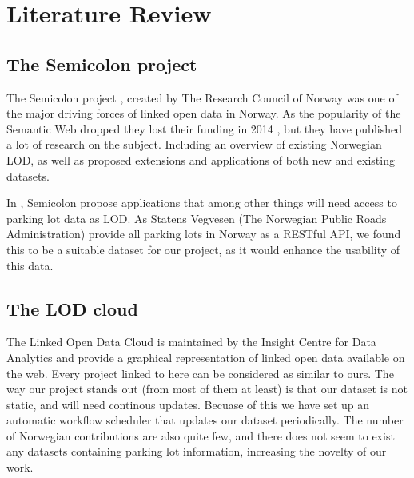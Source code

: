 \chapter{Literature Review}




\section{The Semicolon project}
The Semicolon project \cite{semicolon}, created by The Research Council of Norway was one of the major driving forces of linked open data in Norway. As the popularity of the Semantic Web dropped they lost their funding in 2014 \cite{semicolon-slutt}, but they have published a lot of research on the subject. Including an overview of existing Norwegian LOD, as well as proposed extensions and applications of both new and existing datasets. 

In \cite{semicolon-ii}, Semicolon propose applications that among other things will need access to parking lot data as LOD. As Statens Vegvesen (The Norwegian Public Roads Administration) provide all parking lots in Norway as a RESTful API, we found this to be a suitable dataset for our project, as it would enhance the usability of this data.


\section{The LOD cloud}
The Linked Open Data Cloud \cite{lod-cloud}  is maintained by the Insight Centre for Data Analytics and provide a graphical representation of linked open data available on the web. Every project linked to here can be considered as similar to ours. The way our project stands out (from most of them at least) is that our dataset is not static, and will need continous updates. Becuase of this we have set up an automatic workflow scheduler that updates our dataset periodically. The number of Norwegian contributions are also quite few, and there does not seem to exist any datasets containing parking lot information, increasing the novelty of our work.
